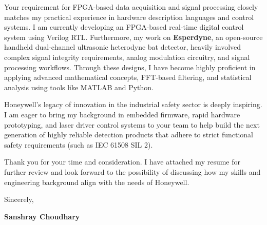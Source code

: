 \documentclass[10pt,a4paper]{article}
\begin{document}
Your requirement for FPGA-based data acquisition and signal processing closely matches my practical experience in hardware description languages and control systems. I am currently developing an FPGA-based real-time digital control system using Verilog RTL. Furthermore, my work on \textbf{Esperdyne}, an open-source handheld dual-channel ultrasonic heterodyne bat detector, heavily involved complex signal integrity requirements, analog modulation circuitry, and signal processing workflows. Through these designs, I have become highly proficient in applying advanced mathematical concepts, FFT-based filtering, and statistical analysis using tools like MATLAB and Python.

Honeywell’s legacy of innovation in the industrial safety sector is deeply inspiring. I am eager to bring my background in embedded firmware, rapid hardware prototyping, and laser driver control systems to your team to help build the next generation of highly reliable detection products that adhere to strict functional safety requirements (such as IEC 61508 SIL 2).

Thank you for your time and consideration. I have attached my resume for further review and look forward to the possibility of discussing how my skills and engineering background align with the needs of Honeywell.

\vspace{1em}

Sincerely,

\vspace{1em}

\textbf{Sanshray Choudhary}
\end{document}

